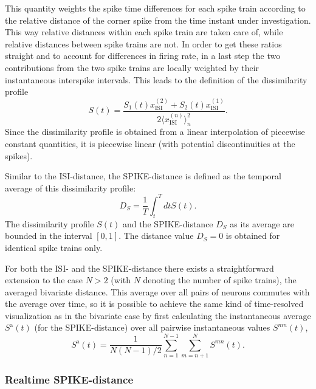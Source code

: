 \documentclass[10pt,twocolumn]{elsart5p}
\begin{document}
This quantity weights the spike time differences for each spike train according to the relative distance of the corner spike from the time instant under investigation. This way relative distances within each spike train are taken care of, while relative distances between spike trains are not. In order to get these ratios straight and to account for differences in firing rate, in a last step the two contributions from the two spike trains are locally weighted by their instantaneous interspike intervals. This leads to the definition of the dissimilarity profile
%
\begin{equation} \label{eq:Bi-Spike-Diss-Improved}
     S (t) = \frac{S_1 (t) x_{\mathrm {ISI}}^{(2)} + S_2 (t) x_{\mathrm {ISI}}^{(1)}}{2 \langle x_{\mathrm {ISI}}^{(n)} \rangle_n^2}.
\end{equation}
%
Since the dissimilarity profile is obtained from a linear interpolation of piecewise constant quantities, it is piecewise linear (with potential discontinuities at the spikes).

Similar to the ISI-distance, the SPIKE-distance is defined as the temporal average of this dissimilarity profile:
%
\begin{equation} \label{eq:Temporal-Average2}
    D_S = \frac{1}{T} \int_{t}^T dt S (t).
\end{equation}
%
The dissimilarity profile $S (t)$ and the SPIKE-distance $D_S$ as its average are bounded in the interval $[0, 1]$. The distance value $D_S = 0$ is obtained for identical spike trains only.

	
For both the ISI- and the SPIKE-distance there exists a straightforward extension to the case $N > 2$ (with $N$ denoting the number of spike trains), the averaged bivariate distance. This average over all pairs of neurons commutes with the average over time, so it is possible to achieve the same kind of time-resolved visualization as in the bivariate case by first calculating the instantaneous average $S^{\mathrm {a}} (t)$ (for the SPIKE-distance) over all pairwise instantaneous values $S^{mn} (t)$,
%
\begin{equation} \label{eq:Bivariate-Average}
    S^{\mathrm {a}} (t) = \frac{1}{N(N-1)/2}\sum_{n=1}^{N-1} \sum_{m=n+1}^N S^{mn} (t).
\end{equation}



\subsubsection{\label{sss:Realtime-Spike-Distance} Realtime SPIKE-distance}
\end{document}
